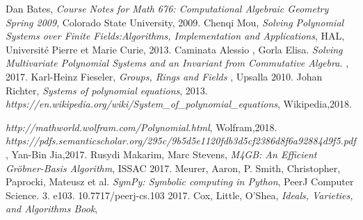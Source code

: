 \documentclass[11pt]{article}
\begin{document}
\begin{thebibliography}{1}
  Dan Bates,
  \textit{Course Notes for Math 676: Computational Algebraic Geometry Spring 2009},
   Colorado State University,
   2009.
  Chenqi Mou,
  \textit{Solving Polynomial Systems over Finite Fields:Algorithms, Implementation and Applications},
   HAL,
   Université Pierre et Marie Curie,
   2013.
  Caminata Alessio , Gorla Elisa.
  \textit{Solving Multivariate Polynomial Systems and an Invariant from Commutative Algebra. },
   2017.
  Karl-Heinz Fieseler,
  \textit{Groups, Rings and Fields },
   Upsalla
   2010.
  Johan Richter,
  \textit{Systems of polynomial equations},
   2013.
  \textit{ https://en.wikipedia.org/wiki/System\_of\_polynomial\_equations},
   Wikipedia,2018.

  \textit{ http://mathworld.wolfram.com/Polynomial.html},
   Wolfram,2018.
  \textit{ https://pdfs.semanticscholar.org/295c/9b5d5e1120fdb3d5cf2386d8f6a92884d9f5.pdf},
   Yan-Bin Jia,2017.
  Rusydi Makarim, Marc Stevens,
  \textit{ M4GB: An Efficient Gröbner-Basis Algorithm},
   ISSAC 2017.
  Meurer, Aaron, P. Smith, Christopher, Paprocki, Mateusz et al.
   \textit{ SymPy: Symbolic computing in Python},
    PeerJ Computer Science. 3. e103. 10.7717/peerj-cs.103 2017.
   Cox, Little, O'Shea,
   \textit{Ideals, Varieties, and Algorithms Book},
\end{thebibliography}
\end{document}
